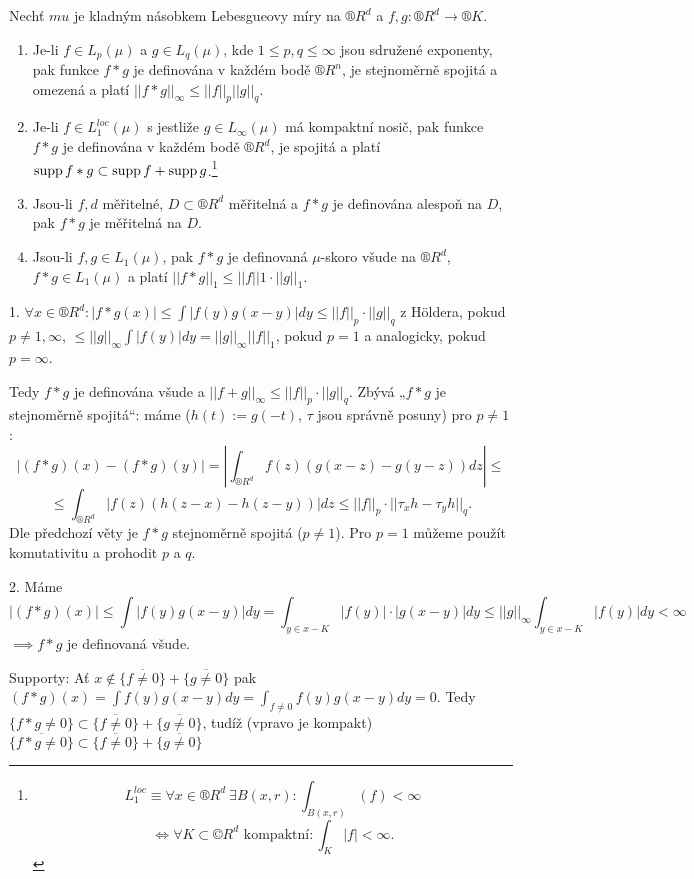 \documentclass[12pt]{article}					%
\begin{document}
\begin{veta}
	Nechť $mu$ je kladným násobkem Lebesgueovy míry na $®R^d$ a $f, g: ®R^d \rightarrow ®K$.

	\begin{enumerate}
		\item Je-li $f \in L_p(\mu)$ a $g \in L_q(\mu)$, kde $1 ≤ p, q ≤ ∞$ jsou sdružené exponenty, pak funkce $f*g$ je definována v každém bodě $®R^n$, je stejnoměrně spojitá a omezená a platí $||f * g||_∞ ≤ ||f||_p ||g||_q$.
		\item Je-li $f \in L_1^{loc}(\mu)$ s jestliže $g \in L_∞(\mu)$ má kompaktní nosič, pak funkce $f * g$ je definována v každém bodě $®R^d$, je spojitá a platí $\operatorname{supp} f*g \subset \operatorname{supp} f + \operatorname{supp} g$.\footnote{$$ L_1^{loc} ≡ \forall x \in ®R^d\ \exists B(x, r): \int_{B(x, r)} (f) < ∞ $$ $$ \Leftrightarrow \forall K \subset ©R^d \text{ kompaktní}: \int_K |f| < ∞. $$}
		\item Jsou-li $f, d$ měřitelné, $D \subset ®R^d$ měřitelná a $f*g$ je definována alespoň na $D$, pak $f*g$ je měřitelná na $D$.
		\item Jsou-li $f, g \in L_1(\mu)$, pak $f*g$ je definovaná $\mu$-skoro všude na $®R^d$, $f*g \in L_1(\mu)$ a platí $||f * g||_1 ≤ ||f||1·||g||_1$.
	\end{enumerate}

	\begin{dukazin}
		1. $\forall x \in ®R^d: |f*g(x)| ≤ \int |f(y)g(x - y)| dy ≤ ||f||_p·||g||_q$ z Höldera, pokud $p ≠ 1, ∞$, $≤ ||g||_∞ \int|f(y)| dy = ||g||_∞ ||f||_1$, pokud $p = 1$ a analogicky, pokud $p = ∞$.

		Tedy $f * g$ je definována všude a $||f + g||_∞ ≤ ||f||_p·||g||_q$. Zbývá „$f*g$ je stejnoměrně spojitá“: máme ($h(t) := g(-t)$, $\tau$ jsou správně posuny) pro $p ≠ 1$:
		$$ |(f * g)(x) - (f * g)(y)| = \left|\int_{®R^d} f(z)(g(x - z) - g(y - z))dz \right| ≤ $$
		$$ ≤ \int_{®R^d} |f(z)(h(z - x) - h(z - y))| dz ≤ ||f||_p · ||\tau_x h - \tau_y h||_q. $$
		Dle předchozí věty je $f * g$ stejnoměrně spojitá ($p ≠ 1$). Pro $p = 1$ můžeme použít komutativitu a prohodit $p$ a $q$.

		2. Máme
		$$ |(f * g)(x)| ≤ \int |f(y)g(x - y)|dy = \int_{y \in x - K} |f(y)|·|g(x - y)| dy ≤ ||g||_∞ \int_{y \in x - K} |f(y)| dy < ∞ $$
		$\implies f*g$ je definovaná všude.

		Supporty: Ať $x \notin \overline{\{f ≠ 0\}} + \overline{\{g ≠ 0\}}$ pak $(f * g)(x) = \int f(y) g(x - y) dy = \int_{f ≠ 0} f(y) g(x - y) dy = 0$. Tedy $\{f * g ≠ 0\} \subset \overline{\{f ≠ 0\}} + \overline{\{g ≠ 0\}}$, tudíž (vpravo je kompakt) $\overline{\{f * g ≠ 0\}} \subset \overline{\{f ≠ 0\}} + \overline{\{g ≠ 0\}}$


\end{dukazin}
\end{veta}
\end{document}
